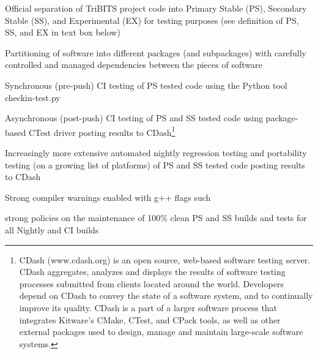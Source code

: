 \documentclass[11pt]{SANDreport}
\begin{document}
\begin{compactitem}

{}\item Official separation of TriBITS project code into Primary Stable (PS),
Secondary Stable (SS), and Experimental (EX) for testing purposes (see
definition of PS, SS, and EX in text box below)

{}\item Partitioning of software into different packages (and
subpackages) with carefully controlled and managed dependencies
between the pieces of software

{}\item Synchronous (pre-push) CI testing of PS tested code using the
Python tool checkin-test.py

{}\item Asynchronous (post-push) CI testing of PS and SS tested code
using package-based CTest driver posting results to
CDash\footnote{CDash (www.cdash.org) is an open source, web-based
software testing server. CDash aggregates, analyzes and displays the
results of software testing processes submitted from clients located
around the world. Developers depend on CDash to convey the state of a
software system, and to continually improve its quality. CDash is a
part of a larger software process that integrates Kitware's CMake,
CTest, and CPack tools, as well as other external packages used to
design, manage and maintain large-scale software systems.}

{}\item Increasingly more extensive automated nightly regression
testing and portability testing (on a growing list of platforms) of PS
and SS tested code posting results to CDash

{}\item Strong compiler warnings enabled with g++ flags such
{}

{}\item strong policies on the maintenance of 100\% clean PS and SS
builds and tests for all Nightly and CI builds

\end{compactitem}
\end{document}
